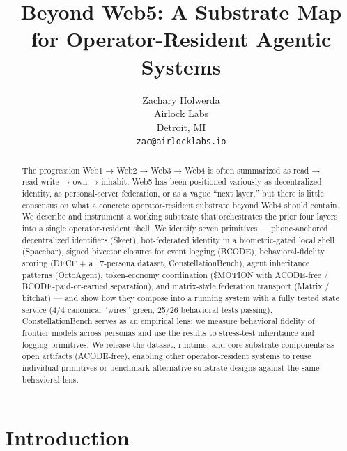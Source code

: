 \documentclass{article}
\title{Beyond Web5: A Substrate Map for Operator-Resident Agentic Systems}
\author{%
  Zachary Holwerda \\
  Airlock Labs \\
  Detroit, MI \\
  \texttt{zac@airlocklabs.io} \\
}
\begin{document}
\maketitle

\begin{abstract}
The progression Web1 → Web2 → Web3 → Web4 is often summarized as read →
read-write → own → inhabit. Web5 has been positioned variously as
decentralized identity, as personal-server federation, or as a vague
``next layer,'' but there is little consensus on what a concrete
operator-resident substrate beyond Web4 should contain. We describe and
instrument a working substrate that orchestrates the prior four layers
into a single operator-resident shell. We identify seven primitives ---
phone-anchored decentralized identifiers (Skeet), bot-federated identity
in a biometric-gated local shell (Spacebar), signed bivector closures
for event logging (BCODE), behavioral-fidelity scoring (DECF + a
17-persona dataset, ConstellationBench), agent inheritance patterns
(OctoAgent), token-economy coordination (\$MOTION with ACODE-free /
BCODE-paid-or-earned separation), and matrix-style federation transport
(Matrix / bitchat) --- and show how they compose into a running system
with a fully tested state service (4/4 canonical ``wires'' green, 25/26
behavioral tests passing). ConstellationBench serves as an empirical
lens: we measure behavioral fidelity of frontier models across personas
and use the results to stress-test inheritance and logging primitives.
We release the dataset, runtime, and core substrate components as open
artifacts (ACODE-free), enabling other operator-resident systems to
reuse individual primitives or benchmark alternative substrate designs
against the same behavioral lens.
\end{abstract}

\section{Introduction}\label{introduction}
\end{document}

